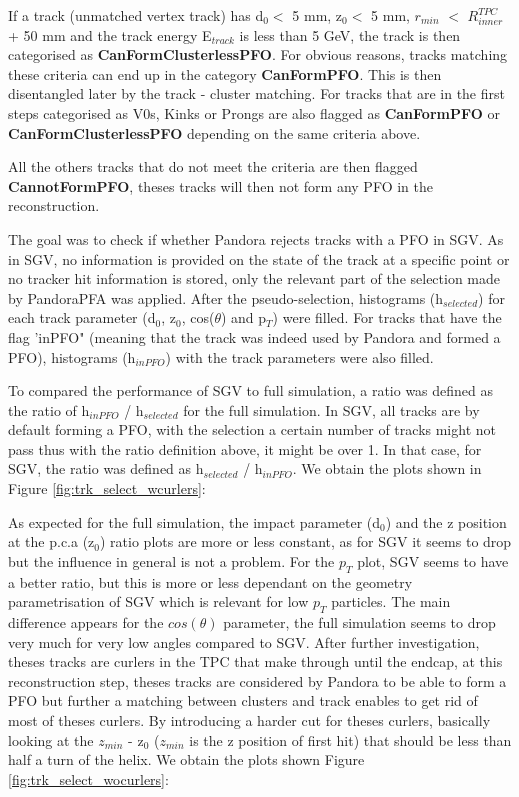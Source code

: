 If a track (unmatched vertex track) has d$_0 <$ 5 mm, z$_0 <$ 5 mm, $r_{min}$  $<$ $R^{TPC}_{inner}$ + 50 mm and the track energy E$_{track}$ is less than 5 GeV, the track is then categorised as \textbf{CanFormClusterlessPFO}. For obvious reasons, tracks matching these criteria can end up in the category \textbf{CanFormPFO}. This is then disentangled later by the track - cluster matching.
For tracks that are in the first steps categorised as V0s, Kinks or Prongs are also flagged as \textbf{CanFormPFO} or \textbf{CanFormClusterlessPFO} depending on the same criteria above.

All the others tracks that do not meet the criteria are then flagged \textbf{CannotFormPFO}, theses tracks will then not form any PFO in the reconstruction.

The goal was to check if whether Pandora rejects tracks with a PFO in SGV. As in SGV, no information is provided on the state of the track at a specific point or no tracker hit information is stored, only the relevant part of the selection made by PandoraPFA was applied. After the pseudo-selection, histograms (h$_{selected}$) for each track parameter (d$_0$, z$_0$, cos($\theta$) and p$_T$) were filled. For tracks that have the flag 'inPFO" (meaning that the track was indeed used by Pandora and formed a PFO), histograms (h$_{inPFO}$) with the track parameters were also filled.

To compared the performance of SGV to full simulation, a ratio was defined as the ratio of h$_{inPFO}$ / h$_{selected}$ for the full simulation. In SGV, all tracks are by default forming a PFO, with the selection a certain number of tracks might not pass thus with the ratio definition above, it might be over 1. In that case, for SGV, the ratio was defined as h$_{selected}$ / h$_{inPFO}$.
We obtain the plots shown in Figure \ref{fig:trk_select_wcurlers}:

As expected for the full simulation, the impact parameter (d$_0$) and the z position at the p.c.a (z$_0$) ratio plots are more or less constant, as for SGV it seems to drop but the influence in general is not a problem. For the $p_{T}$ plot, SGV seems to have a better ratio, but this is more or less dependant on the geometry parametrisation of SGV which is relevant for low $p_{T}$ particles. The main difference appears for the $cos(\theta)$ parameter, the full simulation seems to drop very much for very low angles compared to SGV. After further investigation, theses tracks are curlers in the TPC that make through until the endcap, at this reconstruction step, theses tracks are considered by Pandora to be able to form a PFO but further a matching between clusters and track enables to get rid of most of theses curlers. By introducing a harder cut for theses curlers, basically looking at the $z_{min}$ - z$_0$ ($z_{min}$ is the z position of first hit) that should be less than half a turn of the helix. We obtain the plots shown Figure \ref{fig:trk_select_wocurlers}:

